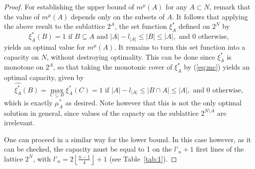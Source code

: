 \documentclass[12pt,a4paper]{article}
\theoremstyle{definition}
\theoremstyle{remark}
\begin{document}
\begin{proof}
For establishing the upper bound of $m^\mu(A)$ for any $A\subset N$,
  remark that the value of $m^\mu(A)$ depends only on the subsets of $A$. It
  follows that applying the above result to the sublattice $2^A$, the set
  function $\xi^*_A$ defined on $2^N$ by
\[
\xi^*_A(B) = 1 \text{ if } B\subseteq A \text{ and }|A|-l_{|A|}\leqslant |B|\leqslant |A|,
\text{ and 0 otherwise},
\]
yields an optimal value for $m^\mu(A)$. It remains to turn this set function
into a capacity on $N$, without destroying optimality. This can be done since $\xi^*_A$
is monotone on $2^A$, so that taking the monotonic cover of $\xi^*_A$ by
(\ref{eq:mc}) yields an optimal capacity, given by
\[
\widehat{\xi^*_A}(B) = \max_{C\subseteq B}\xi^*_A(C) = 1\text{ if }
|A|-l_{|A|}\leqslant |B\cap
A|\leqslant |A|, \text{ and 0 otherwise},
\]
which is exactly $\mu^*_A$ as desired. Note however that this is not the only
optimal solution in general, since values of the capacty on the sublattice
$2^{N\setminus A}$ are irrelevant. 


One can proceed in a similar way for the lower bound. In this case however, as
it can be checked, the
capacity must be equal to 1 on the $l'_n+1$ first lines of the lattice $2^N$,
with $l'_n=2\left\lfloor\frac{n-1}{4}\right\rfloor+1$ (see
Table~\ref{tab:1}).
\end{proof}
\end{document}
